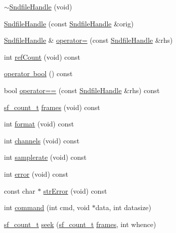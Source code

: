 \begin{DoxyCompactItemize}
\item 
\mbox{\hyperlink{class_sndfile_handle_a64618c3e3c7537b621a9a00b4db18168}{$\sim$\+Sndfile\+Handle}} (void)
\item 
\mbox{\hyperlink{class_sndfile_handle_af9c8bc95a16a9cc913586623c29a3bcd}{Sndfile\+Handle}} (const \mbox{\hyperlink{class_sndfile_handle}{Sndfile\+Handle}} \&orig)
\item 
\mbox{\hyperlink{class_sndfile_handle}{Sndfile\+Handle}} \& \mbox{\hyperlink{class_sndfile_handle_af7f77c3dbd655daed9648b702329ca86}{operator=}} (const \mbox{\hyperlink{class_sndfile_handle}{Sndfile\+Handle}} \&rhs)
\item 
int \mbox{\hyperlink{class_sndfile_handle_a6b56dc2dbe66af6b1fe44adf0f4f371a}{ref\+Count}} (void) const
\item 
\mbox{\hyperlink{class_sndfile_handle_a7f99c56f1af1f6d74c1312a05aaf1a12}{operator bool}} () const
\item 
bool \mbox{\hyperlink{class_sndfile_handle_a37b4778ae0a0e7125f68ea872cecc8e0}{operator==}} (const \mbox{\hyperlink{class_sndfile_handle}{Sndfile\+Handle}} \&rhs) const
\item 
\mbox{\hyperlink{sndfile_8h_af2b12fded74bc949f1f1f392a2af4892}{sf\+\_\+count\+\_\+t}} \mbox{\hyperlink{class_sndfile_handle_a12c7de95fd3134419bf755020d5a018c}{frames}} (void) const
\item 
int \mbox{\hyperlink{class_sndfile_handle_a72b47b9aee449744817a2d6d702ab457}{format}} (void) const
\item 
int \mbox{\hyperlink{class_sndfile_handle_a710add6f87468ca8f9dc444bf35e7ebc}{channels}} (void) const
\item 
int \mbox{\hyperlink{class_sndfile_handle_aa4db003e80513fff2f861cc17d459911}{samplerate}} (void) const
\item 
int \mbox{\hyperlink{class_sndfile_handle_a3918868973e847faad5427697a2ed610}{error}} (void) const
\item 
const char $\ast$ \mbox{\hyperlink{class_sndfile_handle_a1405842e7e672b9789075bf8a4983a13}{str\+Error}} (void) const
\item 
int \mbox{\hyperlink{class_sndfile_handle_a3646fc2e30b01abefe91524e80da6d6e}{command}} (int cmd, void $\ast$data, int datasize)
\item 
\mbox{\hyperlink{sndfile_8h_af2b12fded74bc949f1f1f392a2af4892}{sf\+\_\+count\+\_\+t}} \mbox{\hyperlink{class_sndfile_handle_a0751c210cba5d0d757ce801381743ef3}{seek}} (\mbox{\hyperlink{sndfile_8h_af2b12fded74bc949f1f1f392a2af4892}{sf\+\_\+count\+\_\+t}} \mbox{\hyperlink{class_sndfile_handle_a12c7de95fd3134419bf755020d5a018c}{frames}}, int whence)

\end{DoxyCompactItemize}
